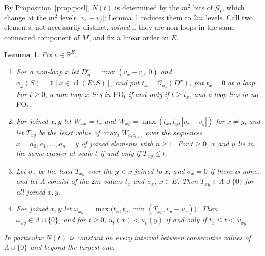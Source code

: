 \documentclass[11pt]{article}
\newtheorem{lemma}[theorem]{Lemma}
\newcommand{\R}{\mathbb R}
\newcommand{\cl}{\operatorname{cl}}
\newcommand{\PO}{\mathrm{PO}}
\newcommand{\CC}{\mathcal C}
\begin{document}
By Proposition~\ref{prop:posl}, $N(t)$ is determined by the $m^{2}$ bits of
$\mathcal G_t$, which change at the $m^{2}$ levels $|v_e-v_f|$;
Lemma~\ref{lem:events} reduces them to $2m$ levels.  Call two elements,
not necessarily distinct, \emph{joined} if they are non-loops in the same connected component of $M$, and
fix a linear order on $E$.

\begin{lemma}
\label{lem:events}
Fix $v\in\R^{E}$.
\begin{enumerate}
  \item For a non-loop $x$ let $D^{x}_g=\max(v_x-v_g,0)$ and
        $\phi_x(S)=\mathbf 1[x\in\cl(E\setminus S)]$, and put
        $t_x=\CC_{\phi_x}(D^{x})$; put $t_x=0$ at a loop.  For $t\ge0$, a non-loop
        $x$ lies in $\PO_t$ if and only if $t\ge t_x$, and a loop lies in no
        $\PO_t$.
  \item For joined $x,y$ let $W_{xx}=t_x$ and $W_{xy}=\max(t_x,t_y,|v_x-v_y|)$ for
        $x\ne y$, and let $T_{xy}$ be the least value of
        $\max_iW_{a_ia_{i+1}}$ over the sequences $x=a_0,a_1,\ldots,a_n=y$ of joined
        elements with $n\ge1$.  For $t\ge0$, $x$ and $y$ lie in the same cluster at scale
        $t$ if and only if $T_{xy}\le t$.
  \item Let $\sigma_x$ be the least $T_{xy}$ over the $y<x$ joined to $x$, and
        $\sigma_x=0$ if there is none, and let $\Lambda$ consist of the $2m$ values
        $t_x$ and $\sigma_x$, $x\in E$.  Then $T_{xy}\in\Lambda\cup\{0\}$ for all
        joined $x,y$.
  \item For joined $x,y$ let
        $\omega_{xy}=\max\bigl(t_x,t_y,\min(T_{xy},v_y-v_x)\bigr)$.  Then
        $\omega_{xy}\in\Lambda\cup\{0\}$, and for $t\ge0$, $u_t(x)<u_t(y)$ if and
        only if $t_x\le t<\omega_{xy}$.
\end{enumerate}
In particular $N(t)$ is constant on every interval between consecutive values of
$\Lambda\cup\{0\}$ and beyond the largest one.
\end{lemma}
\end{document}
